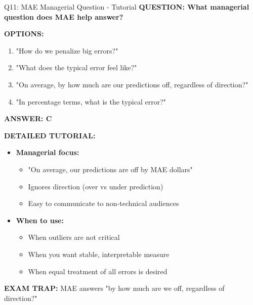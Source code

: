 \documentclass[8pt]{beamer}
\begin{document}
	\begin{frame}{Q11: MAE Managerial Question - Tutorial}
		\fontsize{6.5}{7.5}\selectfont
		\textbf{QUESTION: What managerial question does MAE help answer?}
		
		\vspace{0.1cm}
		\textbf{OPTIONS:}
		\begin{enumerate}
			\item "How do we penalize big errors?"
			\item "What does the typical error feel like?"
			\item "On average, by how much are our predictions off, regardless of direction?"
			\item "In percentage terms, what is the typical error?"
		\end{enumerate}
		
		\vspace{0.1cm}
		\textcolor{myblue}{\textbf{ANSWER: C}}
		
		\vspace{0.1cm}
		\textbf{DETAILED TUTORIAL:}
		\begin{itemize}
			\item \textbf{Managerial focus:}
			\begin{itemize}
				\item "On average, our predictions are off by MAE dollars"
				\item Ignores direction (over vs under prediction)
				\item Easy to communicate to non-technical audiences
			\end{itemize}
			\item \textbf{When to use:}
			\begin{itemize}
				\item When outliers are not critical
				\item When you want stable, interpretable measure
				\item When equal treatment of all errors is desired
			\end{itemize}
		\end{itemize}
		
		\textcolor{myred}{\textbf{EXAM TRAP:}} MAE answers \textcolor{myblue}{"by how much are we off, regardless of direction?"}
	\end{frame}
	
\end{document}

